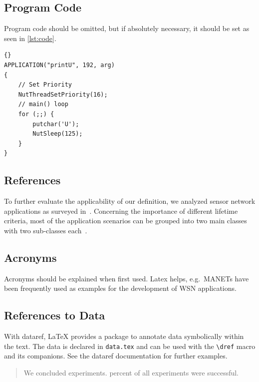 \subsection{Program Code}

Program code should be omitted, but if absolutely necessary, it should be set as seen in \cref{lst:code}.

\begin{lstlisting}[style=txt,caption=Sample application,label=lst:code]{}
APPLICATION("printU", 192, arg)
{
    // Set Priority
    NutThreadSetPriority(16);
    // main() loop
    for (;;) {
        putchar('U');
        NutSleep(125);
    }
}
\end{lstlisting}

\subsection{References}

To further evaluate the applicability of our definition, we analyzed sensor network applications as surveyed in~\cite{akyildiz2002survey,arampatzis2005survey,khemapach2005survey}. Concerning the importance of different lifetime criteria, most of the application scenarios can be grouped into two main classes with two sub-classes each~\cite{dietrich2009lifetime}.


\subsection{Acronyms}

Acronyms should be explained when first used. Latex helps, e.g.\ \acp{MANET} have been frequently used as examples for the development of \ac{WSN} applications.

\subsection{References to Data}

With dataref, \LaTeX{}
provides a package to annotate data symbolically within the text. The
data is declared in \verb|data.tex| and can be used with the
\verb|\dref| macro and its companions. See the dataref documentation
for further examples.

\begin{quote}
  We concluded 
  experiments.  percent of all experiments
  were successful.
\end{quote}


